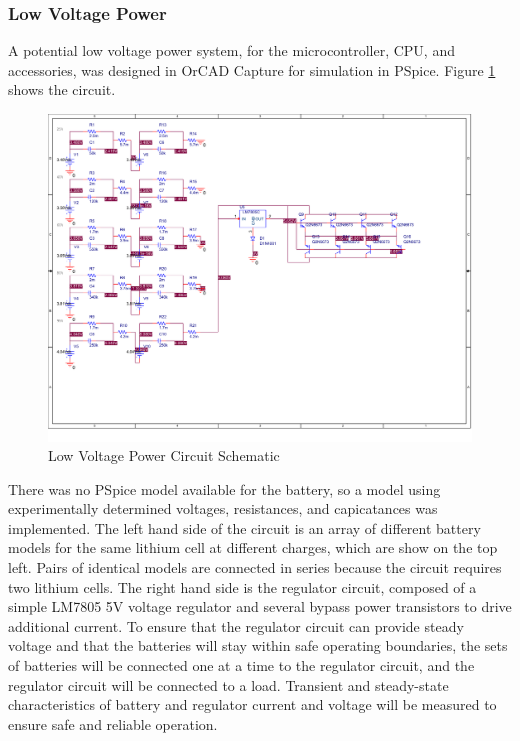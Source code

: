 \documentclass[titlepage, letterpaper,12pt]{article}
\begin{document}
\subsubsection{Low Voltage Power}\label{power-lv-sec}
A potential low voltage power system, for the microcontroller, CPU, and accessories, was designed in OrCAD Capture for simulation in PSpice. Figure \ref{power-lv} shows the circuit.
\begin{figure}[!htbp]\centering
  \includegraphics[width=\linewidth]{power.pdf}
  \caption{Low Voltage Power Circuit Schematic}
  \label{power-lv}
\end{figure}
There was no PSpice model available for the battery, so a model using experimentally determined voltages, resistances, and capicatances was implemented. The left hand side of the circuit is an array of different battery models for the same lithium cell at different charges, which are show on the top left. Pairs of identical models are connected in series because the circuit requires two lithium cells. The right hand side is the regulator circuit, composed of a simple LM7805 5V voltage regulator and several bypass power transistors to drive additional current. To ensure that the regulator circuit can provide steady voltage and that the batteries will stay within safe operating boundaries, the sets of batteries will be connected one at a time to the regulator circuit, and the regulator circuit will be connected to a load. Transient and steady-state characteristics of battery and regulator current and voltage will be measured to ensure safe and reliable operation.
\end{document}
